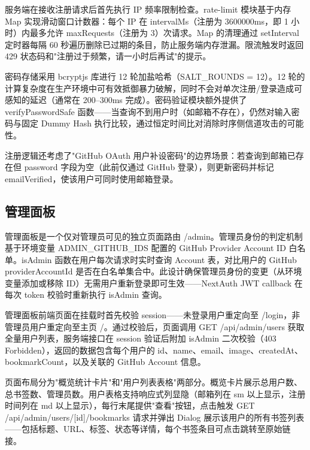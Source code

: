 \documentclass[a4paper,12pt]{ctexart}
\begin{document}
服务端在接收注册请求后首先执行 IP 频率限制检查。rate-limit 模块基于内存 Map 实现滑动窗口计数器：每个 IP 在 intervalMs（注册为 3600000ms，即 1 小时）内最多允许 maxRequests（注册为 3）次请求。Map 的清理通过 setInterval 定时器每隔 60 秒遍历删除已过期的条目，防止服务端内存泄漏。限流触发时返回 429 状态码和"注册过于频繁，请一小时后再试"的提示。

密码存储采用 bcryptjs 库进行 12 轮加盐哈希（SALT\_ROUNDS = 12）。12 轮的计算复杂度在生产环境中可有效抵御暴力破解，同时不会对单次注册/登录造成可感知的延迟（通常在 200--300ms 完成）。密码验证模块额外提供了 verifyPasswordSafe 函数——当查询不到用户时（如邮箱不存在），仍然对输入密码与固定 Dummy Hash 执行比较，通过恒定时间比对消除时序侧信道攻击的可能性。

注册逻辑还考虑了"GitHub OAuth 用户补设密码"的边界场景：若查询到邮箱已存在但 password 字段为空（此前仅通过 GitHub 登录），则更新密码并标记 emailVerified，使该用户可同时使用邮箱登录。


\subsection{管理面板}

管理面板是一个仅对管理员可见的独立页面路由 /admin。管理员身份的判定机制基于环境变量 ADMIN\_GITHUB\_IDS 配置的 GitHub Provider Account ID 白名单。isAdmin 函数在用户每次请求时实时查询 Account 表，对比用户的 GitHub providerAccountId 是否在白名单集合中。此设计确保管理员身份的变更（从环境变量添加或移除 ID）无需用户重新登录即可生效——NextAuth JWT callback 在每次 token 校验时重新执行 isAdmin 查询。

管理面板前端页面在挂载时首先校验 session——未登录用户重定向至 /login，非管理员用户重定向至主页 /。通过校验后，页面调用 GET /api/admin/users 获取全量用户列表，服务端接口在 session 验证后附加 isAdmin 二次校验（403 Forbidden），返回的数据包含每个用户的 id、name、email、image、createdAt、bookmarkCount，以及关联的 GitHub Account 信息。

页面布局分为"概览统计卡片"和"用户列表表格"两部分。概览卡片展示总用户数、总书签数、管理员数。用户表格支持响应式列显隐（邮箱列在 sm 以上显示，注册时间列在 md 以上显示），每行末尾提供"查看"按钮，点击触发 GET /api/admin/users/[id]/bookmarks 请求并弹出 Dialog 展示该用户的所有书签列表——包括标题、URL、标签、状态等详情，每个书签条目可点击跳转至原始链接。
\end{document}
